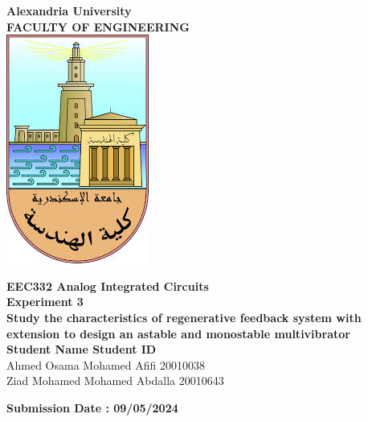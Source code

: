 \documentclass[a4paper, 12pt, english]{article}
\begin{document}
\begin{titlepage}
\begin{center}
\textbf{\LARGE Alexandria University}\\[0.5cm] 
\textbf{\large FACULTY OF ENGINEERING}\\[0.2cm]
\vspace{20pt}
\includegraphics{logo.png}\\[1cm]
\par
\vspace{20pt}
\textbf{\Large EEC332 Analog Integrated Circuits}\\
\vspace{15pt}
\myrule[1pt][7pt]
\textbf{\LARGE  Experiment 3}\\
\vspace{15pt}
\textbf{\large Study the characteristics of regenerative feedback
system with extension to design an astable and
monostable multivibrator}\\
\myrule[1pt][7pt]
\vspace{25pt}
\textbf{\large \hspace{50pt}Student Name \hspace{60pt} Student ID}\\
Ahmed Osama Mohamed Afifi \hspace{60pt} 20010038 \\
Ziad Mohamed Mohamed Abdalla \hspace{40pt} 20010643 \\

\vspace{45pt}
\end{center}

\par
\vfill
\begin{center}
\textbf{Submission Date : 09/05/2024}\\
\end{center}

\end{titlepage}
\end{document}
